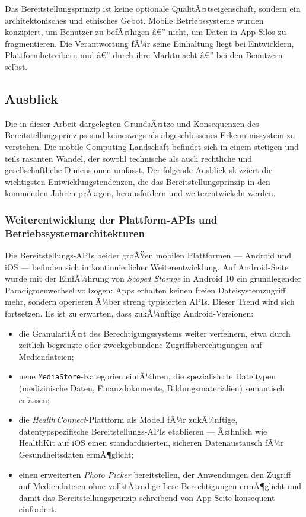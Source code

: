 ﻿\documentclass[12pt, a4paper]{article}
\begin{document}
Das Bereitstellungsprinzip ist keine optionale QualitÃ¤tseigenschaft, sondern
ein architektonisches und ethisches Gebot. Mobile Betriebssysteme wurden
konzipiert, um Benutzer zu befÃ¤higen â€” nicht, um Daten in App-Silos zu
fragmentieren. Die Verantwortung fÃ¼r seine Einhaltung liegt bei Entwicklern,
Plattformbetreibern und â€” durch ihre Marktmacht â€” bei den Benutzern selbst.

\subsection{Ausblick}
\label{sec:ausblick}

Die in dieser Arbeit dargelegten GrundsÃ¤tze und Konsequenzen des Bereitstellungsprinzips
sind keineswegs als abgeschlossenes Erkenntnissystem zu verstehen. Die mobile
Computing-Landschaft befindet sich in einem stetigen und teils rasanten Wandel,
der sowohl technische als auch rechtliche und gesellschaftliche Dimensionen umfasst.
Der folgende Ausblick skizziert die wichtigsten Entwicklungstendenzen, die das
Bereitstellungsprinzip in den kommenden Jahren prÃ¤gen, herausfordern und
weiterentwickeln werden.

\subsubsection{Weiterentwicklung der Plattform-APIs und Betriebssystemarchitekturen}

Die Bereitstellungs-APIs beider groÃŸen mobilen Plattformen --- Android und iOS --- befinden
sich in kontinuierlicher Weiterentwicklung. Auf Android-Seite wurde mit der EinfÃ¼hrung
von \emph{Scoped Storage} in Android 10 ein grundlegender Paradigmenwechsel vollzogen:
Apps erhalten keinen freien Dateisystemzugriff mehr, sondern operieren Ã¼ber streng
typisierten APIs. Dieser Trend wird sich fortsetzen. Es ist zu erwarten, dass
zukÃ¼nftige Android-Versionen:
\begin{itemize}[leftmargin=*]
  \item die GranularitÃ¤t des Berechtigungssystems weiter verfeinern, etwa durch
    zeitlich begrenzte oder zweckgebundene Zugriffsberechtigungen auf Mediendateien;
  \item neue \texttt{MediaStore}-Kategorien einfÃ¼hren, die spezialisierte Dateitypen
    (medizinische Daten, Finanzdokumente, Bildungsmaterialien) semantisch erfassen;
  \item die \emph{Health\,Connect}-Plattform als Modell fÃ¼r zukÃ¼nftige, datentypspezifische
    Bereitstellungs-APIs etablieren --- Ã¤hnlich wie HealthKit auf iOS einen
    standardisierten, sicheren Datenaustausch fÃ¼r Gesundheitsdaten ermÃ¶glicht;
  \item einen erweiterten \emph{Photo Picker} bereitstellen, der Anwendungen den Zugriff
    auf Mediendateien ohne vollstÃ¤ndige Lese-Berechtigungen ermÃ¶glicht und damit das
    Bereitstellungsprinzip schreibend von App-Seite konsequent einfordert.
\end{itemize}
\end{document}
